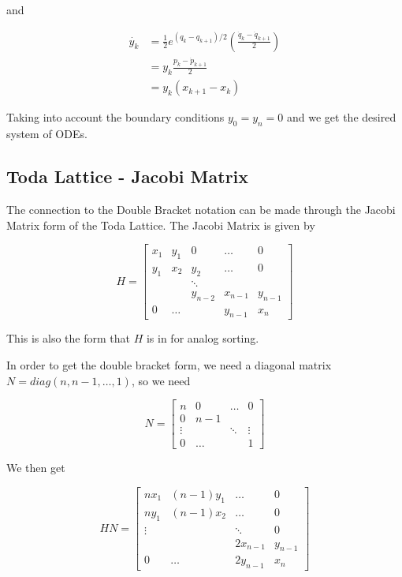 and 

\begin{align*}
    \dot{y_k} &= \frac{1}{2}e^{(q_k-q_{k+1})/2}(\frac{\dot q_k-\dot q_{k+1}}{2}) \\
              &= y_k\frac{p_k-\dot p_{k+1}}{2} \\
              &= y_k(x_{k+1}-x_k) 
\end{align*}

Taking into account the boundary conditions $y_0=y_n=0$ and we get the desired system of ODEs.

\subsection{Toda Lattice - Jacobi Matrix}

The connection to the Double Bracket notation can be made through the Jacobi Matrix form of the Toda Lattice. The Jacobi Matrix is given by

\[ H = \begin{bmatrix}
    x_{1} & y_{1} & 0  & \dots & 0 \\
    y_{1} & x_{2} & y_{2} & \dots & 0 \\
     & & \ddots & \\
          &       & y_{n-2} & x_{n-1} & y_{n-1}\\
    0 & \hdots & & y_{n-1} & x_{n}
\end{bmatrix}\]

This is also the form that $H$ is in for analog sorting.

In order to get the double bracket form, we need a diagonal matrix $N = diag(n, n-1, \dots, 1)$, so we need 

\[
N = \begin{bmatrix}
        n & 0 & \hdots & 0 \\
        0 & n-1 & \\
        \vdots &  & \ddots & \vdots \\
        0 & \hdots & & 1
    \end{bmatrix}
\]

We then get 

\[ 
HN = \begin{bmatrix}
        nx_1 & (n-1)y_1 & \hdots & 0 \\
        ny_1 & (n-1)x_2 & \hdots & 0 \\
        \vdots & & \ddots & 0\\
         &  & 2x_{n-1} & y_{n-1} \\
        0 & \hdots & 2y_{n-1} & x_n

    \end{bmatrix}
\]

